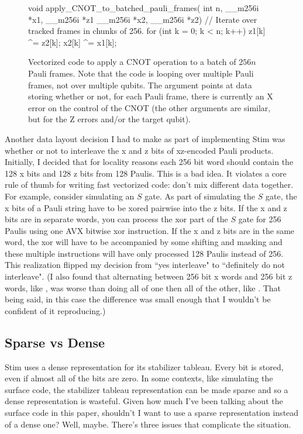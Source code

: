 \documentclass[onecolumn,unpublished]{quantumarticle}
\theoremstyle{definition}
\theoremstyle{definition}
\theoremstyle{definition}
\begin{document}
\begin{figure}
    \centering
\begin{cpp}
    void apply_CNOT_to_batched_pauli_frames(
            int n, __m256i *x1, __m256i *z1 __m256i *x2, __m256i *z2) {
        // Iterate over tracked frames in chunks of 256.
        for (int k = 0; k < n; k++) {
            z1[k] ^= z2[k];
            x2[k] ^= x1[k];
        }
    }
\end{cpp}
    \caption{
        Vectorized code to apply a CNOT operation to a batch of $256n$ Pauli frames.
        Note that the code is looping over multiple Pauli frames, not over multiple qubits.
        The argument \protect{} points at data storing whether or not, for each Pauli frame, there is currently an X error on the control of the CNOT (the other arguments are similar, but for the Z errors and/or the target qubit).
    }
    \label{fig:pauli_frame_code}
\end{figure}

Another data layout decision I had to make as part of implementing Stim was whether or not to interleave the x and z bits of xz-encoded Pauli products.
Initially, I decided that for locality reasons each 256 bit word should contain the 128 x bits and 128 z bits from 128 Paulis.
This is a bad idea.
It violates a core rule of thumb for writing fast vectorized code: don't mix different data together.
For example, consider simulating  an $S$ gate.
As part of simulating the $S$ gate, the x bits of a Pauli string have to be xored pairwise into the z bits.
If the x and z bits are in separate words, you can process the xor part of the $S$ gate for 256 Paulis using one AVX bitwise xor instruction.
If the x and z bits are in the same word, the xor will have to be accompanied by some shifting and masking and these multiple instructions will have only processed 128 Paulis instead of 256.
This realization flipped my decision from ``yes interleave" to ``definitely do not interleave".
(I also  found that alternating between 256 bit x words and 256 bit z words, like , was worse than doing all of one then all of the other, like .
That being said, in this case the difference was small enough that I wouldn't be confident of it reproducing.)

\subsection{Sparse vs Dense}
\label{sec:sparsevdense}

Stim uses a dense representation for its stabilizer tableau.
Every bit is stored, even if almost all of the bits are zero.
In some contexts, like simulating the surface code, the stabilizer tableau representation can be made sparse and so a dense representation is wasteful.
Given how much I've been talking about the surface code in this paper, shouldn't I want to use a sparse representation instead of a dense one?
Well, maybe.
There's three issues that complicate the situation.
\end{document}

